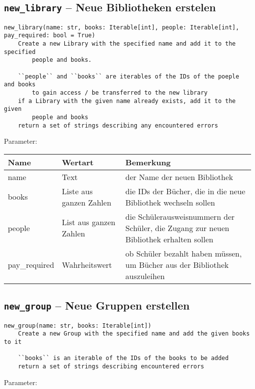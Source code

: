 \subsection{\texttt{new\_library} -- Neue Bibliotheken erstelen}
\label{subsec:command_list:new_library}

\begin{verbatim}
new_library(name: str, books: Iterable[int], people: Iterable[int], 
pay_required: bool = True)
    Create a new Library with the specified name and add it to the specified
        people and books.

    ``people`` and ``books`` are iterables of the IDs of the poeple and books
        to gain access / be transferred to the new library
    if a Library with the given name already exists, add it to the given
        people and books
    return a set of strings describing any encountered errors
\end{verbatim}

Parameter:

\begin{tabular}{|p{}|p{}|p{}|}
Name & Wertart & Bemerkung\\
\hline
name & Text & der Name der neuen Bibliothek \\
books & Liste aus ganzen Zahlen & die IDs der Bücher, die in die neue Bibliothek wechseln sollen \\
people & List aus ganzen Zahlen & die Schülerausweisnummern der Schüler, die Zugang zur neuen Bibliothek erhalten sollen \\
pay\_required & Wahrheitswert & ob Schüler bezahlt haben müssen, um Bücher aus der Bibliothek auszuleihen
\end{tabular}

\subsection{\texttt{new\_group} -- Neue Gruppen erstellen}
\label{subsec:command_list:new_group}

\begin{verbatim}
new_group(name: str, books: Iterable[int])
    Create a new Group with the specified name and add the given books to it

    ``books`` is an iterable of the IDs of the books to be added
    return a set of strings describing encountered errors
\end{verbatim}

Parameter:

